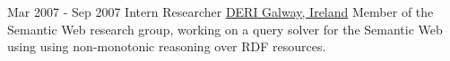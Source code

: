 \documentclass[letterpaper]{twentysecondcv} %
\begin{document}
\begin{twenty}
     \twentyitem
        {Mar 2007 -}
        {Sep 2007}
        {Intern Researcher}
        {\href{http://www.deri.ie/}{DERI Galway, Ireland}}
        {Member of the Semantic Web research group, working on a query solver for the Semantic Web using using non-monotonic reasoning over RDF resources.}
        {
        }
        
\end{twenty}
\end{document}
